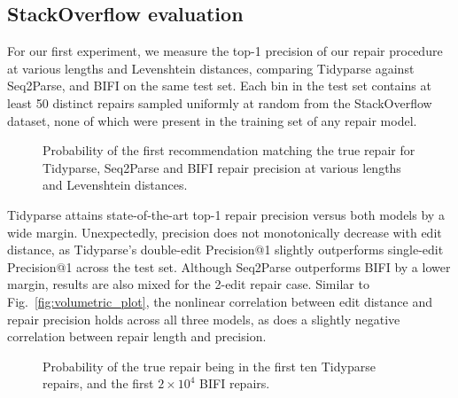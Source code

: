 \documentclass[sigplan,acmsmall,nonacm,screen]{acmart}\settopmatter{printfolios=false,printccs=false,printacmref=false}
\begin{document}
\clearpage\subsection{StackOverflow evaluation}\label{sec:rq2}

For our first experiment, we measure the top-1 precision of our repair procedure at various lengths and Levenshtein distances, comparing Tidyparse against Seq2Parse, and BIFI on the same test set. Each bin in the test set contains at least 50 distinct repairs sampled uniformly at random from the StackOverflow dataset, none of which were present in the training set of any repair model.\vspace{-0.2cm}

\begin{figure}[h!]
\resizebox{.29\textwidth}{!}{}\hspace{0.5cm}
\resizebox{.29\textwidth}{!}{}\hspace{0.5cm}
\resizebox{.29\textwidth}{!}{}
\caption{Probability of the first recommendation matching the true repair for Tidyparse, Seq2Parse and BIFI repair precision at various lengths and Levenshtein distances.}\label{fig:len_dist_prec}
\end{figure}\vspace{-0.2cm}

Tidyparse attains state-of-the-art top-1 repair precision versus both models by a wide margin. Unexpectedly, precision does not monotonically decrease with edit distance, as Tidyparse's double-edit Precision@1 slightly outperforms single-edit Precision@1 across the test set. Although Seq2Parse outperforms BIFI by a lower margin, results are also mixed for the 2-edit repair case. Similar to Fig.~\ref{fig:volumetric_plot}, the nonlinear correlation between edit distance and repair precision holds across all three models, as does a slightly negative correlation between repair length and precision.

\begin{figure}
\vspace{-0.1cm}
\resizebox{.24\textwidth}{!}{}
\resizebox{.24\textwidth}{!}{}
\caption{Probability of the true repair being in the first ten Tidyparse repairs, and the first $2\times10^4$ BIFI repairs.}\label{fig:len_dist_prec_all}
\vspace{-0.3cm}
\end{figure}
\end{document}
